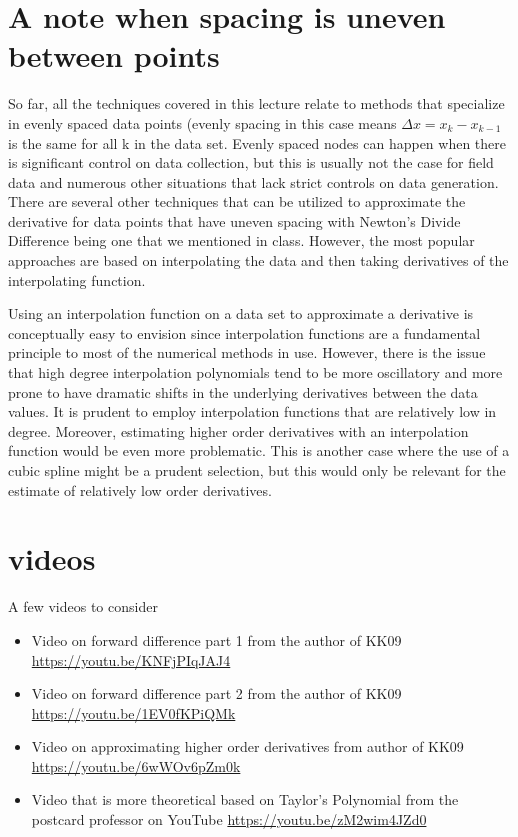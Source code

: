 \documentclass[twoside]{article}
\def\ds{\displaystyle}
\begin{document}
\section{A note when spacing is uneven between points}
So far, all the techniques covered in this lecture relate to methods that specialize in evenly spaced data points (evenly spacing in this case means $\ds \Delta x = x_k-x_{k-1}$ is the same for all k in the data set. Evenly spaced nodes can happen when there is significant control on data collection, but this is usually not the case for field data and numerous other situations that lack strict controls on data generation. There are several other techniques that can be utilized to approximate the derivative for data points that have uneven spacing with Newton's Divide Difference being one that we mentioned in class. However, the most popular approaches are based on interpolating the data and then taking derivatives of the interpolating function. 

Using an interpolation function on a data set to approximate a derivative is conceptually easy to envision since interpolation functions are a fundamental principle to most of the numerical methods in use. However, there is the issue that high degree interpolation polynomials tend to be more oscillatory and more prone to have dramatic shifts in the underlying derivatives between the data values. It is prudent to employ interpolation functions that are relatively low in degree. Moreover, estimating higher order derivatives with an interpolation function would be even more problematic. This is another case where the use of a cubic spline might be a prudent selection, but this would only be relevant for the estimate of relatively low order derivatives. 

\section{videos}
A few videos to consider
\begin{itemize}

\item Video on forward difference part 1 from the author of KK09 \href{https://youtu.be/KNFjPIqJAJ4}{https://youtu.be/KNFjPIqJAJ4}
\item Video on forward difference part 2 from the author of KK09 \href{https://youtu.be/1EV0fKPiQMk}{https://youtu.be/1EV0fKPiQMk}
\item Video on approximating higher order derivatives from author of KK09 \href{https://youtu.be/6wWOv6pZm0k}{https://youtu.be/6wWOv6pZm0k}
\item Video that is more theoretical based on Taylor's Polynomial from the postcard professor on YouTube \href{https://youtu.be/zM2wim4JZd0}{https://youtu.be/zM2wim4JZd0}
\end{itemize}
\end{document}

